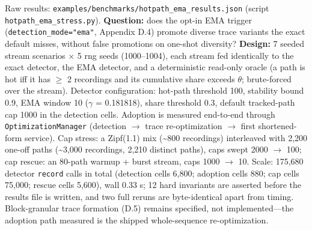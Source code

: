 \documentclass[
  11pt,
]{article}
\begin{document}
Raw results: \texttt{examples/benchmarks/hotpath\_ema\_results.json}
(script \texttt{hotpath\_ema\_stress.py}). \textbf{Question:} does the
opt-in EMA trigger (\texttt{detection\_mode="ema"}, Appendix D.4)
promote diverse trace variants the exact default misses, without false
promotions on one-shot diversity? \textbf{Design:} 7 seeded stream
scenarios \(\times\) 5 rng seeds (1000--1004), each stream fed
identically to the exact detector, the EMA detector, and a deterministic
read-only oracle (a path is hot iff it has \(\geq\) 2 recordings and its
cumulative share exceeds \(\theta\); brute-forced over the stream).
Detector configuration: hot-path threshold 100, stability bound 0.9, EMA
window 10 (\(\gamma\) = 0.181818), share threshold 0.3, default
tracked-path cap 1000 in the detection cells. Adoption is measured
end-to-end through \texttt{OptimizationManager} (detection
\(\rightarrow\) trace re-optimization \(\rightarrow\) first
shortened-form service). Cap stress: a Zipf(1.1) mix (\textasciitilde800
recordings) interleaved with 2,200 one-off paths (\textasciitilde3,000
recordings, 2,210 distinct paths), caps swept 2000 \(\rightarrow\) 100;
cap rescue: an 80-path warmup + burst stream, caps 1000 \(\rightarrow\)
10. Scale: 175,680 detector \texttt{record} calls in total (detection
cells 6,800; adoption cells 880; cap cells 75,000; rescue cells 5,600),
wall 0.33 s; 12 hard invariants are asserted before the results file is
written, and two full reruns are byte-identical apart from timing.
Block-granular trace formation (D.5) remains specified, not
implemented---the adoption path measured is the shipped whole-sequence
re-optimization.
\end{document}
